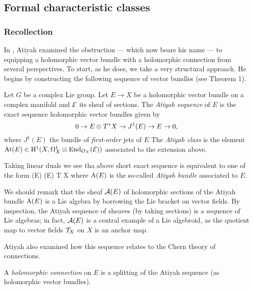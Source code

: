 \documentclass[10pt]{amsart}
\begin{document}
\subsection{Formal characteristic classes}

\subsubsection{Recollection}

In \cite{atiyah}, Atiyah examined the obstruction --- which now bears his name --- to equipping a holomorphic vector bundle with a holomorphic connection from several perspectives. To start, as he does, we take a very structural approach. He begins by constructing the following sequence of vector bundles (see Theorem 1).

\begin{dfn}
Let $G$ be a complex Lie group. Let $E \to X$ be a holomorphic vector
bundle on a complex manifold and $\mathcal E$ its sheaf of sections. The {\em Atiyah sequence} of $E$ is the
exact sequence holomorphic vector bundles given by
\[
0 \to E \otimes T^* X \to J^1(E) \to E \to 0,
\]
where $J^1(E)$ the bundle of {\em first-order} jets of $E$
The {\em Atiyah class} is the element ${\rm At}(E) \in {\rm H}^1(X, \Omega^1_X
\otimes {\rm End}_{\mathcal O_X} (\mathcal E))$ associated to the extension above. 
\end{dfn}

\begin{rmk}
Taking linear duals we see tha above short exact sequence is
equivalent to one of the form
 \to \End (E) (E) \to T X 
\een
where ${\rm A}(E)$ is the so-called {\em Atiyah bundle} associated to $E$. 

We should remark that the sheaf $\mathcal A(E)$ of holomorphic sections of the Atiyah bundle ${\rm A}(E)$ is a Lie algebra by borrowing the Lie bracket on vector fields.
By inspection, the Atiyah sequence of sheaves (by taking sections) is a sequence of Lie algebras; 
 in fact, $\mathcal A(E)$ is a central example of a Lie algebroid, as the quotient map to vector fields $\mathcal T_X$ on $X$ is an anchor map.
\end{rmk}

Atiyah also examined how this sequence relates to the Chern theory of connections.

\begin{prop} 
A {\em holomorphic connection} on $E$ is a splitting of the Atiyah sequence (as holomorphic vector bundles).
\end{prop}
\end{document}
